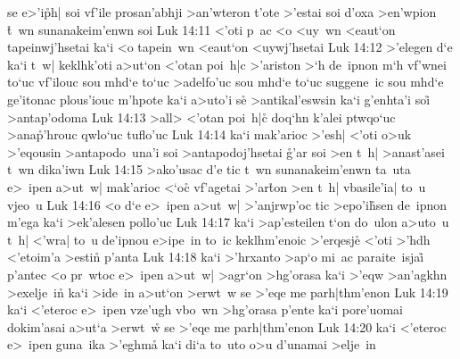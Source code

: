 se
e>'i\r{p}h|
soi
vf'ile
prosan'abhji
>an'wteron
t'ote
>'estai
soi
d'oxa
>en'wpion
\r{t}~wn
sunanakeim'enwn
soi\bibvsend
\vs Luk 14:11
<'oti
p~ac
<o
<uy~wn
<eaut`on
tapeinwj'hsetai
ka`i
<o
tapein~wn
<eaut`on
<uywj'hsetai\bibvsend
\vs Luk 14:12
>'elegen
d`e
ka`i
t~w|
keklhk'oti
a>ut`on
<'otan
poi~h|c
>'ariston
>`h
de~ipnon
m`h
vf'wnei
to`uc
vf'ilouc
sou
mhd`e
to`uc
>adelfo'uc
sou
mhd`e
to`uc
suggene~ic
sou
mhd`e
ge'itonac
plous'iouc
m'hpote
ka`i
a>uto'i
se\r{}
>antikal'eswsin
ka`i
g'enhta'i
soi\r{}
>antap'odoma\bibvsend
\vs Luk 14:13
>all>
<'otan
poi~h|c\r{}
doq`hn
k'alei
ptwqo`uc
>ana\r{p}'hrouc
qwlo`uc
tuflo'uc\bibvsend
\vs Luk 14:14
ka`i
mak'arioc
>'esh|
<'oti
o>uk
>'eqousin
>antapodo~una'i
soi
>antapodoj'hsetai
\r{g}'ar
soi
>en
t~h|
>anast'asei
t~wn
dika'iwn\bibvsend
\vs Luk 14:15
>ako'usac
d'e
tic
t~wn
sunanakeim'enwn
ta~uta
e>~ipen
a>ut~w|
mak'arioc
<`o\r{c}
vf'agetai
>'ar\r{t}on
>en
t~h|
vbasile'ia|
to~u
vjeo~u\bibvsend
\vs Luk 14:16
<o
d`e
e>~ipen
a>ut~w|
>'anjrwp'oc
tic
>epo'i\r{h}sen
de~ipnon
m'ega
ka`i
>ek'alesen
pollo'uc\bibvsend
\vs Luk 14:17
ka`i
>ap'esteilen
t`on
do~ulon
a>uto~u
t~h|
<'wra|
to~u
de'ipnou
e>ipe~in
to~ic
keklhm'enoic
>'erqesj\r{e}
<'oti
>'hdh
<'etoim'a
>estin\r{}
p'anta\bibvsend
\vs Luk 14:18
ka`i
>'hrxanto
>ap`o
mi~ac
paraite~isjai\r{}
p'antec
<o
pr~wtoc
e>~ipen
a>ut~w|
>agr`on
>hg'orasa
ka`i
>'eqw
>an'agkhn
>exelje~in\r{}
ka`i
>ide~in
a>ut`on
>erwt~w
se
>'eqe
me
parh|thm'enon\bibvsend
\vs Luk 14:19
ka`i
<'eteroc
e>~ipen
vze'ugh
vbo~wn
>hg'orasa
p'ente
ka`i
pore'uomai
dokim'asai
a>ut`a
>erwt~w\r{}
se
>'eqe
me
parh|thm'enon\bibvsend
\vs Luk 14:20
ka`i
<'eteroc
e>~ipen
guna~ika
>'eghma\r{}
ka`i
di`a
to~uto
o>u
d'unamai
>elje~in\bibvsend
